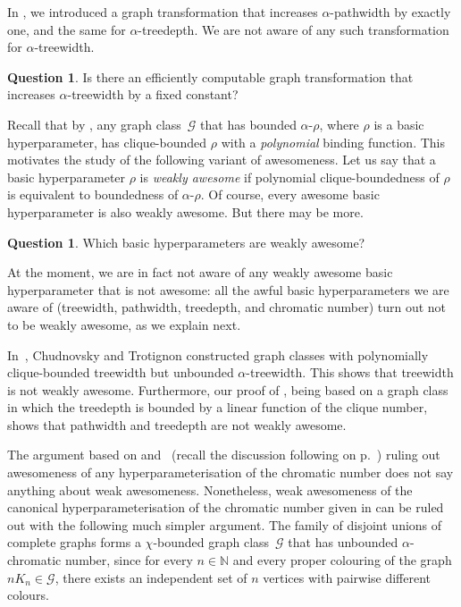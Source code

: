 \documentclass[11pt]{article}
\theoremstyle{plain}
\theoremstyle{definition}
\newtheorem{question}[theorem]{Question}
\theoremstyle{remark}
\numberwithin{equation}{section}
\begin{document}
In , we introduced a graph transformation that increases $\alpha$-pathwidth by exactly one, and the same for $\alpha$-treedepth.
We are not aware of any such transformation for $\alpha$-treewidth.

\begin{question}
Is there an efficiently computable graph transformation that increases $\alpha$-treewidth by a fixed constant?
\end{question}

Recall that by , any graph class~$\mathcal{G}$ that has bounded $\alpha\text{-}\rho$, where $\rho$ is a basic hyperparameter, has clique-bounded $\rho$ with a \textsl{polynomial} binding function.
This motivates the study of the following variant of awesomeness.
Let us say that a basic hyperparameter $\rho$ is \emph{weakly awesome} if polynomial clique-boundedness of $\rho$ is equivalent to boundedness of $\alpha\text{-}\rho$.
Of course, every awesome basic hyperparameter is also weakly awesome.
But there may be more.
 
\begin{question}
Which basic hyperparameters are weakly awesome? 
\end{question}

At the moment, we are in fact not aware of any weakly awesome basic hyperparameter that is not awesome: all the awful basic hyperparameters we are aware of (treewidth, pathwidth, treedepth, and chromatic number) turn out not to be weakly awesome, as we explain next.

In~\cite{CT24}, Chudnovsky and Trotignon constructed graph classes with polynomially clique-bounded treewidth but unbounded $\alpha$-treewidth.
This shows that treewidth is not weakly awesome.
Furthermore, our proof of , being based on a graph class in which the treedepth is bounded by a linear function of the clique number, shows that pathwidth and treedepth are not weakly awesome.

The argument based on  and~\cite{MR4707561} (recall the discussion following  on p.~\pageref{discussion-awful-chi}) ruling out awesomeness of any hyperparameterisation of the chromatic number does not say anything about weak awesomeness.
Nonetheless, weak awesomeness of the canonical hyperparameterisation of the chromatic number given in  can be ruled out with the following much simpler argument.
The family of disjoint unions of complete graphs forms a $\chi$-bounded graph class~$\mathcal{G}$ that has unbounded $\alpha$-chromatic number, since for every $n\in \mathbb{N}$ and every proper colouring of the graph $nK_n\in \mathcal{G}$, there exists an independent set of $n$ vertices with pairwise different colours.
\end{document}
